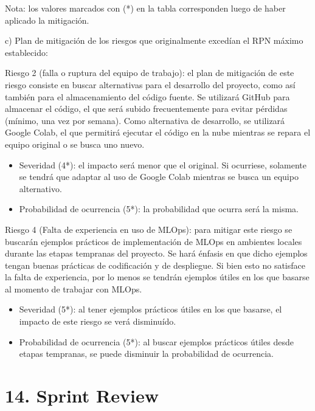 \documentclass[
11pt, %
]{charter}
\begin{document}
Nota: los valores marcados con (*) en la tabla corresponden luego de haber aplicado la mitigación.

c) Plan de mitigación de los riesgos que originalmente excedían el RPN máximo establecido:
 
Riesgo 2 (falla o ruptura del equipo de trabajo):
el plan de mitigación de este riesgo consiste en buscar alternativas para el desarrollo del proyecto, como así también para el almacenamiento del código fuente. Se utilizará GitHub para almacenar el código, el que será subido frecuentemente para evitar pérdidas (mínimo, una vez por semana). Como alternativa de desarrollo, se utilizará Google Colab, el que permitirá ejecutar el código en la nube mientras se repara el equipo original o se busca uno nuevo.
\begin{itemize}
	\item Severidad (4*): el impacto será menor que el original. Si ocurriese, solamente se tendrá que adaptar al uso de Google Colab mientras se busca un equipo alternativo.
	\item Probabilidad de ocurrencia (5*): la probabilidad que ocurra será la misma.
\end{itemize}

Riesgo 4 (Falta de experiencia en uso de MLOps):
para mitigar este riesgo se buscarán ejemplos prácticos de implementación de MLOps en ambientes locales durante las etapas tempranas del proyecto. Se hará énfasis en que dicho ejemplos tengan buenas prácticas de codificación y de despliegue. Si bien esto no satisface la falta de experiencia, por lo menos se tendrán ejemplos útiles en los que basarse al momento de trabajar con MLOps.
\begin{itemize}
    \item Severidad (5*): al tener ejemplos prácticos útiles en los que basarse, el impacto de este riesgo se verá disminuído.
    \item Probabilidad de ocurrencia (5*): al buscar ejemplos prácticos útiles desde etapas tempranas, se puede disminuir la probabilidad de ocurrencia.
\end{itemize}
 
\section{14. Sprint Review}
\label{sec:sprint_review}

\end{document}
